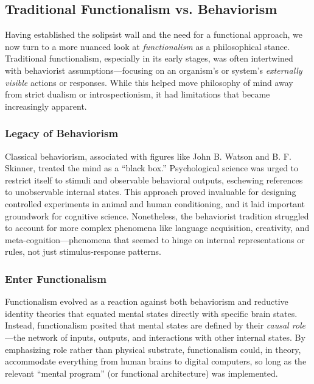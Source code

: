 \documentclass[12pt]{article}
\begin{document}
\subsection{Traditional Functionalism vs. Behaviorism}

Having established the solipsist wall and the need for a functional approach, we now turn to a more nuanced look at \textit{functionalism} as a philosophical stance. Traditional functionalism, especially in its early stages, was often intertwined with behaviorist assumptions---focusing on an organism's or system's \textit{externally visible} actions or responses. While this helped move philosophy of mind away from strict dualism or introspectionism, it had limitations that became increasingly apparent.

\subsubsection{Legacy of Behaviorism}

Classical behaviorism, associated with figures like John B. Watson and B. F. Skinner, treated the mind as a ``black box.'' Psychological science was urged to restrict itself to stimuli and observable behavioral outputs, eschewing references to unobservable internal states. This approach proved invaluable for designing controlled experiments in animal and human conditioning, and it laid important groundwork for cognitive science. Nonetheless, the behaviorist tradition struggled to account for more complex phenomena like language acquisition, creativity, and meta-cognition---phenomena that seemed to hinge on internal representations or rules, not just stimulus-response patterns.

\subsubsection{Enter Functionalism}

Functionalism evolved as a reaction against both behaviorism and reductive identity theories that equated mental states directly with specific brain states. Instead, functionalism posited that mental states are defined by their \textit{causal role}---the network of inputs, outputs, and interactions with other internal states. By emphasizing role rather than physical substrate, functionalism could, in theory, accommodate everything from human brains to digital computers, so long as the relevant ``mental program'' (or functional architecture) was implemented.
\end{document}
